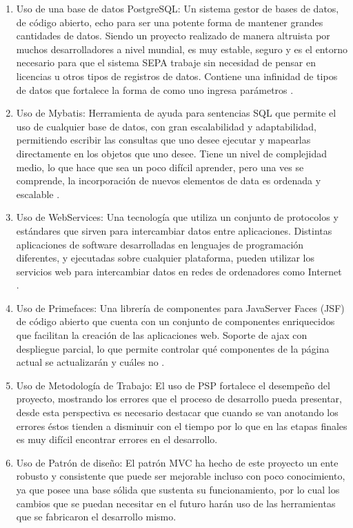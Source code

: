 \documentclass[a4paper,12pt,openany,oneside]{book}
\begin{document}
\begin{enumerate}
        \item Uso de una base de datos PostgreSQL: Un sistema gestor de bases de datos, de código abierto, echo para ser una potente forma de mantener grandes cantidades de datos. Siendo un proyecto realizado de manera altruista por muchos desarrolladores a nivel mundial, es muy estable, seguro y es el entorno necesario para que el sistema SEPA trabaje sin necesidad de pensar en licencias u otros tipos de registros de datos. Contiene una infinidad de tipos de datos que fortalece la forma de como uno ingresa parámetros \cite{data18}.
        \item Uso de Mybatis: Herramienta de ayuda para sentencias SQL que permite el uso de cualquier base de datos, con gran escalabilidad y adaptabilidad, permitiendo escribir las consultas que uno desee ejecutar y mapearlas directamente en los objetos que uno desee. Tiene un nivel de complejidad medio, lo que hace que sea un poco difícil aprender, pero una ves se comprende, la incorporación de nuevos elementos de data es ordenada y escalable  \cite{data19}.
        \item Uso de WebServices: Una tecnología que utiliza un conjunto de protocolos y estándares que sirven para intercambiar datos entre aplicaciones. Distintas aplicaciones de software desarrolladas en lenguajes de programación diferentes, y ejecutadas sobre cualquier plataforma, pueden utilizar los servicios web para intercambiar datos en redes de ordenadores como Internet \cite{data20}.
        \item Uso de Primefaces: Una librería de componentes para JavaServer Faces (JSF) de código abierto que cuenta con un conjunto de componentes enriquecidos que facilitan la creación de las aplicaciones web. Soporte de ajax con despliegue parcial, lo que permite controlar qué componentes de la página actual se actualizarán y cuáles no \cite{data21}.
        \item Uso de Metodología de Trabajo: El uso de PSP fortalece el desempeño del proyecto, mostrando los errores que el proceso de desarrollo pueda presentar, desde esta perspectiva es necesario destacar que cuando se van anotando los errores éstos tienden a disminuir con el tiempo por lo que en las etapas finales es muy difícil encontrar errores en el desarrollo.
        \item Uso de Patrón de diseño: El patrón MVC ha hecho de este proyecto un ente robusto y consistente que puede ser mejorable incluso con poco conocimiento, ya que posee una base sólida que sustenta su funcionamiento, por lo cual los cambios que se puedan necesitar en el futuro harán uso de las herramientas que se fabricaron el desarrollo mismo.

\end{enumerate}
\end{document}
